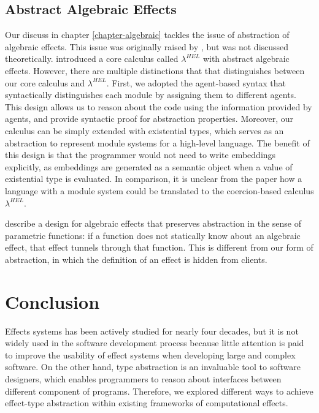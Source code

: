 \subsection{Abstract Algebraic Effects}
Our discuss in chapter \ref{chapter-algebraic} tackles the issue of abstraction of algebraic effects. This issue was originally raised by \citet{leijen18}, but was not discussed theoretically. \citet{biernacki19} introduced a core calculus called $\lambda^{HEL}$ with abstract algebraic effects. However, there are multiple distinctions that that distinguishes between our core calculus and $\lambda^{HEL}$. First, we adopted the agent-based syntax that syntactically distinguishes each module by assigning them to different agents. This design allows us to reason about the code using the information provided by agents, and provide syntactic proof for abstraction properties. Moreover, our calculus can be simply extended with existential types, which serves as an abstraction to represent module systems for a high-level language. The benefit of this design is that the programmer would not need to write embeddings explicitly, as embeddings are generated as a semantic object when a value of existential type is evaluated. In comparison, it is unclear from the paper \cite{biernacki19} how a language with a module system could be translated to the coercion-based calculus $\lambda^{HEL}$.

\citet{Zhang19} describe a design for algebraic effects that preserves abstraction in the sense of parametric functions: if a function does not statically know about an algebraic effect, that effect tunnels through that function.  This is different from our form of abstraction, in which the definition of an effect is hidden from clients.


\section{Conclusion}

Effects systems has been actively studied for nearly four decades, but it is not widely used in the software development process because little attention is paid to improve the usability of effect systems when developing large and complex software. On the other hand, type abstraction is an invaluable tool to software designers, which enables programmers to reason about interfaces between different component of programs. Therefore, we explored different ways to achieve effect-type abstraction within existing frameworks of computational effects.

